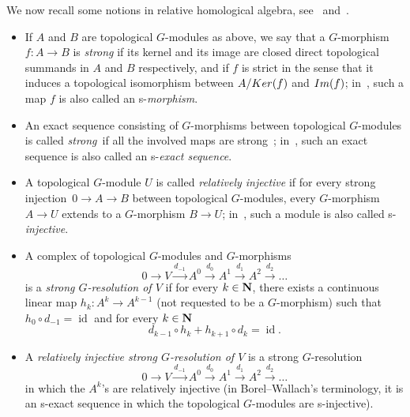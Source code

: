 \documentclass[11pt]{article}
\theoremstyle{definition}
\numberwithin{equation}{section}
\numberwithin{figure}{section}
\numberwithin{table}{section}
\DeclareMathOperator{\idm}{id}
\begin{document}
We now recall some notions in relative homological algebra, see~\cite[Chapter~I, \textsection~2 and Chapter~III, \textsection~1]{Gui} and~\cite[Chapter~IX, \textsection~1.5]{BW}.
\begin{itemize}
\item If $A$ and $B$ are topological $G$-modules as above, we say that a $G$-morphism $f : A \to B$ is \emph{strong} if its kernel and its image are closed direct topological summands in $A$ and $B$ respectively, and if $f$ is strict in the sense that it induces a topological isomorphism between $A/{\rm Ker}(f)$ and ${\rm Im}(f)$; in~\cite[Chapter~IX, \textsection~1.5, p.~172]{BW}, such a map $f$ is also called an s-\emph{morphism}.
\item An exact sequence consisting of $G$-morphisms between topological $G$-modules is called \emph{strong}~if all the involved maps are strong~; in~\cite[Chapter~IX, \textsection~1.5, p.~172]{BW}, such an exact sequence is also called an s-\emph{exact sequence}.
\item A topological $G$-module $U$ is called \emph{relatively injective} if for every strong injection~$0 \to A \to B$ between topological $G$-modules, every $G$-morphism $A \to U$ extends to a $G$-morphism $B \to U$; in~\cite[Chapter~IX, \textsection~1.5, p.~172]{BW}, such a module is also called s-\emph{injective}.

\item A complex of topological $G$-modules and $G$-morphisms
\[
0 \to V \stackrel{d_{-1}}{\to} A^0 \stackrel{d_0}{\to} A^1 \stackrel{d_1}{\to} A^2 \stackrel{d_2}{\to}\dots
\]
is a \emph{strong $G$-resolution of $V$} if for every $k \in {\bf N}$, there exists a continuous linear map $h_k: A^k \to A^{k-1}$ (not requested to be a $G$-morphism) such that $h _0 \circ d_{-1} = \idm$ and for every $k \in {\bf N}$
\[
d_{k-1} \circ h_k + h_{k+1} \circ d_k = \idm.
\]
\item A \emph{relatively injective strong $G$-resolution of $V$} is a strong $G$-resolution 
\[
0 \to V \stackrel{d_{-1}}{\to} A^0 \stackrel{d_0}{\to} A^1 \stackrel{d_1}{\to} A^2 \stackrel{d_2}{\to}\dots
\]
in which the $A^{k}$'s are relatively injective (in Borel--Wallach's terminology, it is an s-exact sequence in which the topological $G$-modules are s-injective).
\end{itemize}
\end{document}
